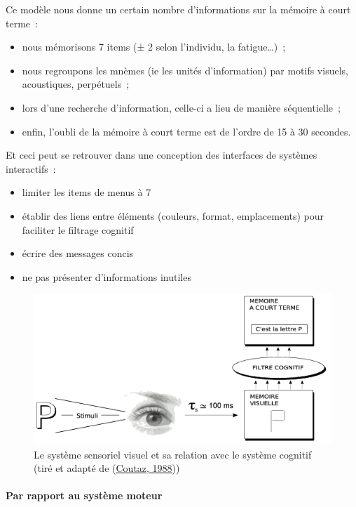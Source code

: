 \documentclass[
]{book}
\providecommand{\tightlist}{%
  \setlength{\itemsep}{0pt}\setlength{\parskip}{0pt}}
\begin{document}
Ce modèle nous donne un certain nombre d'informations sur la mémoire à
court terme~:

\begin{itemize}
\tightlist
\item
  nous mémorisons 7 items (± 2 selon l'individu, la
  fatigue\ldots)~;
\item
  nous regroupons les mnèmes (ie les unités
  d'information) par motifs visuels, acoustiques, perpétuels~;
\item
  lors d'une recherche d'information, celle-ci a lieu
  de manière séquentielle~;
\item
  enfin, l'oubli de la mémoire à court terme est de
  l'ordre de 15 à 30 secondes.
\end{itemize}

Et ceci peut se retrouver dans une conception des interfaces de systèmes
interactifs~:

\begin{itemize}
\tightlist
\item
  limiter les items de menus à 7
\item
  établir des liens entre éléments (couleurs, format,
  emplacements) pour faciliter le filtrage cognitif
\item
  écrire des messages concis
\item
  ne pas présenter d'informations inutiles
\end{itemize}

\begin{figure}
\centering
\includegraphics{img/systemecognitif.png}
\caption{\label{fig:coutaz}Le système sensoriel visuel et sa relation avec le système
cognitif (tiré et adapté de (\protect\hyperlink{ref-coutaz1988interface}{Coutaz, 1988}))}
\end{figure}

\hypertarget{par-rapport-au-systuxe8me-moteur}{%
\paragraph{Par rapport au système moteur}\label{par-rapport-au-systuxe8me-moteur}}
\end{document}
